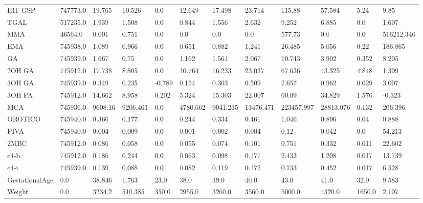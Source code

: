 \begin{tabular}{llllllllllll}
IRT-GSP & 747773.0 & 19.765 & 10.526 & 0.0 & 12.649 & 17.498 & 23.714 & 115.88 & 57.584 & 5.24 & 9.85 \\
TGAL & 517235.0 & 1.939 & 1.508 & 0.0 & 0.844 & 1.556 & 2.632 & 9.252 & 6.885 & 0.0 & 1.607 \\
MMA & 46564.0 & 0.001 & 0.751 & 0.0 & 0.0 & 0.0 & 0.0 & 577.73 & 0.0 & 0.0 & 516212.346 \\
EMA & 745938.0 & 1.089 & 0.966 & 0.0 & 0.651 & 0.882 & 1.241 & 26.485 & 5.056 & 0.22 & 186.865 \\
GA & 745939.0 & 1.667 & 0.75 & 0.0 & 1.162 & 1.561 & 2.067 & 10.743 & 3.902 & 0.352 & 8.205 \\
2OH GA & 745912.0 & 17.738 & 8.805 & 0.0 & 10.764 & 16.233 & 23.037 & 67.636 & 43.325 & 4.848 & 1.309 \\
3OH GA & 745939.0 & 0.349 & 0.235 & -0.789 & 0.154 & 0.303 & 0.509 & 2.657 & 0.962 & 0.029 & 3.007 \\
3OH PA & 745912.0 & 14.662 & 8.958 & 0.202 & 5.324 & 15.303 & 22.007 & 60.09 & 34.829 & 1.576 & -0.323 \\
MCA & 745936.0 & 9608.16 & 9206.461 & 0.0 & 4780.662 & 9041.235 & 13476.471 & 223457.997 & 28813.076 & 0.132 & 206.396 \\
OROTICO & 745940.0 & 0.366 & 0.177 & 0.0 & 0.244 & 0.334 & 0.461 & 1.046 & 0.896 & 0.04 & 0.888 \\
PIVA & 745940.0 & 0.004 & 0.009 & 0.0 & 0.001 & 0.002 & 0.004 & 0.12 & 0.042 & 0.0 & 54.213 \\
2MBC & 745912.0 & 0.086 & 0.058 & 0.0 & 0.055 & 0.074 & 0.101 & 0.751 & 0.332 & 0.011 & 22.602 \\
c4-b & 745912.0 & 0.186 & 0.244 & 0.0 & 0.063 & 0.098 & 0.177 & 2.433 & 1.208 & 0.017 & 13.739 \\
c4-i & 745939.0 & 0.139 & 0.088 & 0.0 & 0.082 & 0.119 & 0.172 & 0.733 & 0.452 & 0.017 & 6.528 \\
GestationalAge & 0.0 & 38.846 & 1.763 & 23.0 & 38.0 & 39.0 & 40.0 & 43.0 & 41.0 & 32.0 & 9.583 \\
Weight & 0.0 & 3234.2 & 510.385 & 350.0 & 2955.0 & 3260.0 & 3560.0 & 5000.0 & 4320.0 & 1650.0 & 2.107 \\
\bottomrule
\end{tabular}
